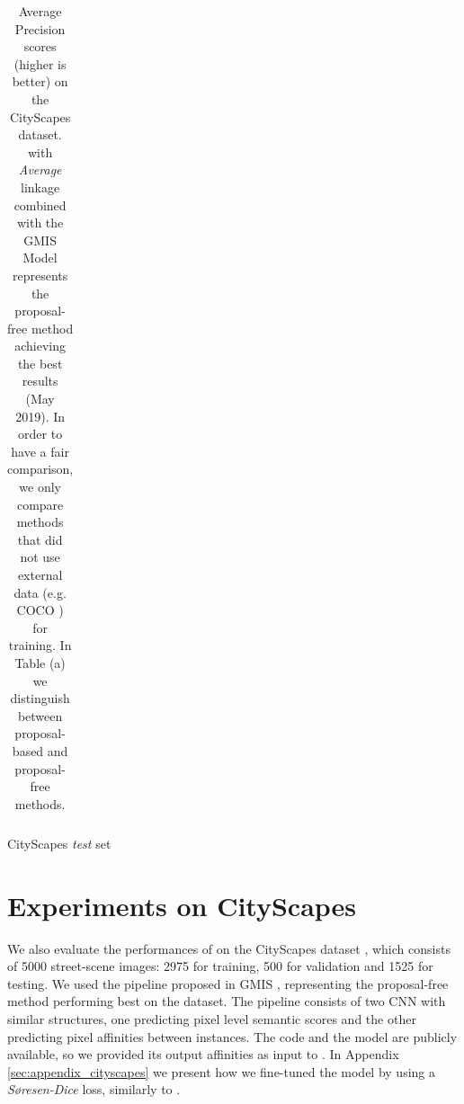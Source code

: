 \begin{table}[t]
\begin{subtable}{0.46\textwidth}
\begin{tabular}{l|cc}
        \end{tabular}
    \caption{CityScapes \emph{test} set}
    \label{tab:results_cityscapes_test}
\end{subtable}
\caption{Average Precision scores (higher is better) on the CityScapes dataset. \algname{} with \emph{Average} linkage combined with the GMIS Model \cite{liu2018affinity} represents the proposal-free method achieving the best results (May 2019). In order to have a fair comparison, we only compare methods that did not use external data (e.g. COCO \cite{lin2014microsoft}) for training. In Table (a) we distinguish between proposal-based and proposal-free methods.}\label{tab:results_cityscapes}
\end{table}


\section{Experiments on CityScapes}\label{sec:cityscapes_exp}
We also evaluate the performances of \algname{} on the CityScapes dataset \cite{cordts2016cityscapes}, which consists of 5000 street-scene images: 2975 for training, 500 for validation and 1525 for testing.
We used the pipeline proposed in GMIS \cite{liu2018affinity}, representing the proposal-free method performing best on the dataset. The pipeline consists of two CNN with similar structures, one predicting pixel level semantic scores and the other predicting pixel affinities between instances. The code and the model are publicly available, so we provided its output affinities as input to \algname{}.
In Appendix \ref{sec:appendix_cityscapes} we present how we fine-tuned the model by using a \emph{S\o resen-Dice} loss, similarly to \cite{wolf2018mutex}.

